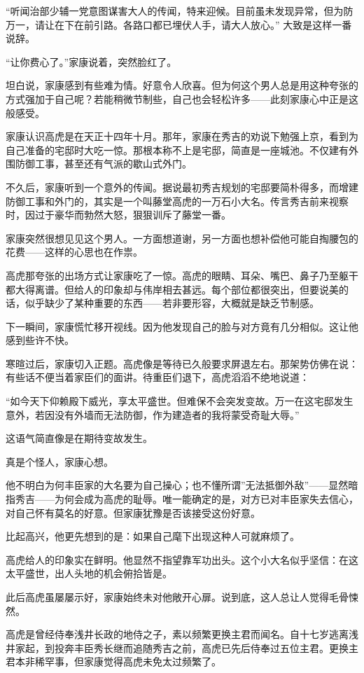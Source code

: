 \documentclass[
]{book}
\begin{document}
``听闻治部少辅一党意图谋害大人的传闻，特来迎候。目前虽未发现异常，但为防万一，请让在下在前引路。各路口都已埋伏人手，请大人放心。''
大致是这样一番说辞。

``让你费心了。''家康说着，突然脸红了。

坦白说，家康感到有些难为情。好意令人欣喜。但为何这个男人总是用这种夸张的方式强加于自己呢？若能稍微节制些，自己也会轻松许多------此刻家康心中正是这般感受。

家康认识高虎是在天正十四年十月。那年，家康在秀吉的劝说下勉强上京，看到为自己准备的宅邸时大吃一惊。那根本称不上是宅邸，简直是一座城池。不仅建有外围防御工事，甚至还有气派的歇山式外门。

不久后，家康听到一个意外的传闻。据说最初秀吉规划的宅邸要简朴得多，而增建防御工事和外门的，其实是一个叫藤堂高虎的一万石小大名。传言秀吉前来视察时，因过于豪华而勃然大怒，狠狠训斥了藤堂一番。

家康突然很想见见这个男人。一方面想道谢，另一方面也想补偿他可能自掏腰包的花费------这样的心思也在作祟。

高虎那夸张的出场方式让家康吃了一惊。高虎的眼睛、耳朵、嘴巴、鼻子乃至躯干都大得离谱。但给人的印象却与伟岸相去甚远。每个部位都很突出，但要说美的话，似乎缺少了某种重要的东西------若非要形容，大概就是缺乏节制感。

下一瞬间，家康慌忙移开视线。因为他发现自己的脸与对方竟有几分相似。这让他感到些许不快。

寒暄过后，家康切入正题。高虎像是等待已久般要求屏退左右。那架势仿佛在说：有些话不便当着家臣们的面讲。待重臣们退下，高虎滔滔不绝地说道：

``如今天下仰赖殿下威光，享太平盛世。但难保不会突发变故。万一在这宅邸发生意外，若因没有外墙而无法防御，作为建造者的我将蒙受奇耻大辱。''

这语气简直像是在期待变故发生。

真是个怪人，家康心想。

他不明白为何丰臣家的大名要为自己操心；也不懂所谓''无法抵御外敌''------显然暗指秀吉------为何会成为高虎的耻辱。唯一能确定的是，对方已对丰臣家失去信心，对自己怀有莫名的好意。但家康犹豫是否该接受这份好意。

比起高兴，他更先想到的是：如果自己麾下出现这种人可就麻烦了。

高虎给人的印象实在鲜明。他显然不指望靠军功出头。这个小大名似乎坚信：在这太平盛世，出人头地的机会俯拾皆是。

此后高虎虽屡屡示好，家康始终未对他敞开心扉。说到底，这人总让人觉得毛骨悚然。

高虎是曾经侍奉浅井长政的地侍之子，素以频繁更换主君而闻名。自十七岁逃离浅井家起，到投奔丰臣秀长继而追随秀吉之前，高虎已先后侍奉过五位主君。更换主君本非稀罕事，但家康觉得高虎未免太过频繁了。
\end{document}
